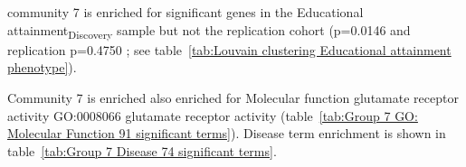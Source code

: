 community 7 is enriched for significant genes in the Educational attainment\textsubscript{Discovery} sample but not the replication cohort (p=0.0146 and replication p=0.4750 ; see table~\ref{tab:Louvain clustering Educational attainment phenotype}).




Community 7 is enriched also enriched for Molecular function glutamate receptor activity GO:0008066 	glutamate receptor activity (table~\ref{tab:Group 7 GO: Molecular Function 91 significant terms}). Disease term enrichment is shown in table~\ref{tab:Group 7 Disease 74 significant terms}.






